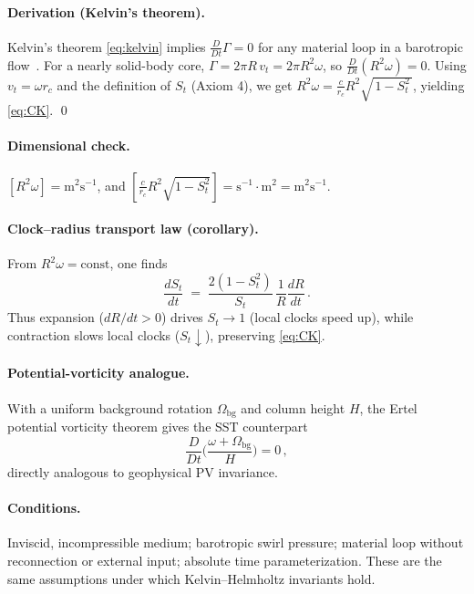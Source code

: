 \documentclass[11pt]{article}
\begin{document}
\paragraph{Derivation (Kelvin's theorem).}
    Kelvin's theorem \ref{eq:kelvin}  implies $\frac{D}{Dt}\Gamma=0$ for any material loop in a barotropic flow~\cite{Helmholtz1858,Kelvin1869,Batchelor1967}. For a nearly solid-body core, $\Gamma = 2\pi R\, v_t = 2\pi R^2 \omega$, so $\frac{D}{Dt}(R^2 \omega)=0$. Using $v_t = \omega r_c$ and the definition of $S_t$ (Axiom 4), we get $R^2\omega=\frac{c}{r_c}R^2\sqrt{\,1-S_t^2\,}$, yielding \eqref{eq:CK}. \qed

\paragraph{Dimensional check.}
    $[R^2\omega] = \mathrm{m}^2\mathrm{s}^{-1}$, and $[\frac{c}{r_c}R^2\sqrt{1-S_t^2}] = \mathrm{s}^{-1}\cdot \mathrm{m}^2 = \mathrm{m}^2\mathrm{s}^{-1}$.

\paragraph{Clock–radius transport law (corollary).}
    From $R^2\omega=\mathrm{const}$, one finds
    \begin{equation}
    \frac{dS_t}{dt} \;=\; \frac{2(1-S_t^2)}{S_t}\,\frac{1}{R}\frac{dR}{dt}\,.
    \label{eq:clock-radius-ode}
    \end{equation}
    Thus expansion ($dR/dt>0$) drives $S_t\to 1$ (local clocks speed up), while contraction slows local clocks ($S_t\downarrow$), preserving \eqref{eq:CK}.

\paragraph{Potential-vorticity analogue.}
    With a uniform background rotation $\Omega_{\text{bg}}$ and column height $H$, the Ertel potential vorticity theorem gives the SST counterpart~\cite{Ertel1942,Batchelor1967}
    \begin{equation}
    \frac{D}{Dt}\Big(\frac{\omega + \Omega_{\text{bg}}}{H}\Big)=0\,,
    \label{eq:PV-analogue}
    \end{equation}
    directly analogous to geophysical PV invariance.

\paragraph{Conditions.}
    Inviscid, incompressible medium; barotropic swirl pressure; material loop without reconnection or external input; absolute time parameterization. These are the same assumptions under which Kelvin–Helmholtz invariants hold.
\end{document}
